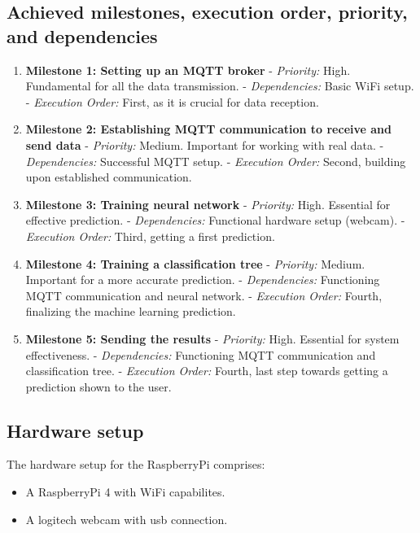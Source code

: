 \documentclass{article}
\begin{document}
\subsection{Achieved milestones, execution order, priority, and dependencies}
\begin{enumerate}
    \item \textbf{Milestone 1: Setting up an MQTT broker}
       - \textit{Priority:} High. Fundamental for all the data transmission.
       - \textit{Dependencies:} Basic WiFi setup.
       - \textit{Execution Order:} First, as it is crucial for data reception.

    \item \textbf{Milestone 2: Establishing MQTT communication to receive and send data}
       - \textit{Priority:} Medium. Important for working with real data.
       - \textit{Dependencies:} Successful MQTT setup.
       - \textit{Execution Order:} Second, building upon established communication.

    \item \textbf{Milestone 3: Training neural network}
       - \textit{Priority:} High. Essential for effective prediction.
       - \textit{Dependencies:} Functional hardware setup (webcam).
       - \textit{Execution Order:} Third, getting a first prediction.

    \item \textbf{Milestone 4: Training a classification tree}
       - \textit{Priority:} Medium. Important for a more accurate prediction.
       - \textit{Dependencies:} Functioning MQTT communication and neural network.
       - \textit{Execution Order:} Fourth, finalizing the machine learning prediction.

    \item \textbf{Milestone 5: Sending the results}
       - \textit{Priority:} High. Essential for system effectiveness.
       - \textit{Dependencies:} Functioning MQTT communication and classification tree.
       - \textit{Execution Order:} Fourth, last step towards getting a prediction shown to the user.
\end{enumerate}

\subsection{Hardware setup}
The hardware setup for the RaspberryPi comprises:
\begin{itemize}
    \item A RaspberryPi 4 with WiFi capabilites.
    \item A logitech webcam with usb connection.
\end{itemize}
\end{document}
